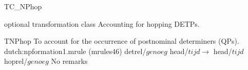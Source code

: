 \begin{mruleclass}{TC\_NPhop}
\begin{classdescr}
\kind optional transformation  class
\classtask Accounting for hopping DETPs.
\classremarks
\nofilters
\nospeedrules
\noplannedrules
\norulesnotince
\begin{comments}
\end{comments}
\end{classdescr}

\begin{members}
\begin{member}
 TNPhop
 To account for the occurrence of postnominal determiners (QPs).
\file dutch:npformation1.mrule (mrules46)
\semantics \nosemantics
\example detrel/$genoeg$ head/$tijd \rightarrow$ head/$tijd$ hoprel/$genoeg$
\remarks No remarks
\end{member}
\end{members}
\end{mruleclass}

